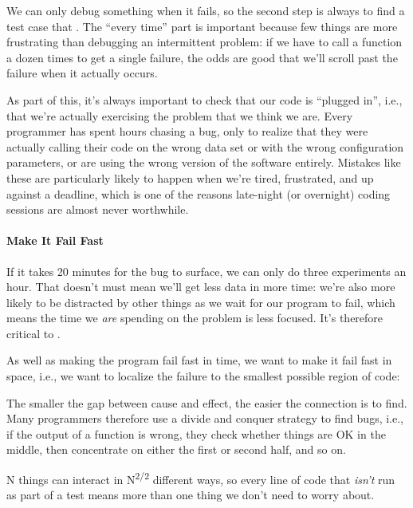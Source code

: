\documentclass{book}
\begin{document}
We can only debug something when it fails, so the second step is always
to find a test case that
. The ``every time'' part is important because few things are more
frustrating than debugging an intermittent problem: if we have to call a
function a dozen times to get a single failure, the odds are good that
we'll scroll past the failure when it actually occurs.

As part of this, it's always important to check that our code is
``plugged in'', i.e., that we're actually exercising the problem that we
think we are. Every programmer has spent hours chasing a bug, only to
realize that they were actually calling their code on the wrong data set
or with the wrong configuration parameters, or are using the wrong
version of the software entirely. Mistakes like these are particularly
likely to happen when we're tired, frustrated, and up against a
deadline, which is one of the reasons late-night (or overnight) coding
sessions are almost never worthwhile.

\mbox{}\paragraph{Make It Fail Fast}

If it takes 20 minutes for the bug to surface, we can only do three
experiments an hour. That doesn't must mean we'll get less data in more
time: we're also more likely to be distracted by other things as we wait
for our program to fail, which means the time we \emph{are} spending on
the problem is less focused. It's therefore critical to
.

As well as making the program fail fast in time, we want to make it fail
fast in space, i.e., we want to localize the failure to the smallest
possible region of code:

\begin{swcenumerate}
\item
  The smaller the gap between cause and effect, the easier the
  connection is to find. Many programmers therefore use a divide and
  conquer strategy to find bugs, i.e., if the output of a function is
  wrong, they check whether things are OK in the middle, then
  concentrate on either the first or second half, and so on.
\item
  N things can interact in N\textsuperscript{2/2} different ways, so
  every line of code that \emph{isn't} run as part of a test means more
  than one thing we don't need to worry about.
\end{swcenumerate}
\end{document}
